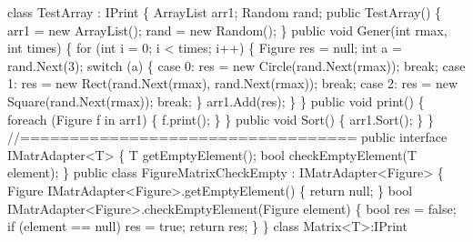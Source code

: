 \begin{DoxyCode}
    \textcolor{keyword}{class }TestArray : IPrint
    \{
        ArrayList arr1;
        Random rand;
        \textcolor{keyword}{public} TestArray()
        \{
            arr1 = \textcolor{keyword}{new} ArrayList();
            rand = \textcolor{keyword}{new} Random();
        \}
        \textcolor{keyword}{public} \textcolor{keywordtype}{void} Gener(\textcolor{keywordtype}{int} rmax, \textcolor{keywordtype}{int} times)
        \{
            \textcolor{keywordflow}{for} (\textcolor{keywordtype}{int} i = 0; i < times; i++)
            \{
                Figure res = null;
                \textcolor{keywordtype}{int} a = rand.Next(3);
                \textcolor{keywordflow}{switch} (a)
                \{
                    \textcolor{keywordflow}{case} 0:
                        res = \textcolor{keyword}{new} Circle(rand.Next(rmax));
                        \textcolor{keywordflow}{break};
                    \textcolor{keywordflow}{case} 1:
                        res = \textcolor{keyword}{new} Rect(rand.Next(rmax), rand.Next(rmax));
                        \textcolor{keywordflow}{break};
                    \textcolor{keywordflow}{case} 2:
                        res = \textcolor{keyword}{new} Square(rand.Next(rmax));
                        \textcolor{keywordflow}{break};
                \}
                arr1.Add(res);
            \}
        \}
        \textcolor{keyword}{public} \textcolor{keywordtype}{void} print()
        \{
            \textcolor{keywordflow}{foreach} (Figure f \textcolor{keywordflow}{in} arr1)
            \{
                f.print();
            \}
        \}
        \textcolor{keyword}{public} \textcolor{keywordtype}{void} Sort()
        \{
            arr1.Sort();
        \}
    \}
    \textcolor{comment}{//==================================}
    \textcolor{keyword}{public} \textcolor{keyword}{interface }IMatrAdapter<T>
    \{
       T getEmptyElement();
       \textcolor{keywordtype}{bool} checkEmptyElement(T element);
    \}
    \textcolor{keyword}{public} \textcolor{keyword}{class }FigureMatrixCheckEmpty : IMatrAdapter<Figure>
    \{
        Figure IMatrAdapter<Figure>.getEmptyElement()
        \{
            \textcolor{keywordflow}{return} null;
        \}
        \textcolor{keywordtype}{bool} IMatrAdapter<Figure>.checkEmptyElement(Figure element)
        \{
            \textcolor{keywordtype}{bool} res = \textcolor{keyword}{false};
            \textcolor{keywordflow}{if} (element == null)
                res = \textcolor{keyword}{true};
            \textcolor{keywordflow}{return} res;
        \}
    \}
    \textcolor{keyword}{class }Matrix<T>:IPrint

\end{DoxyCode}
